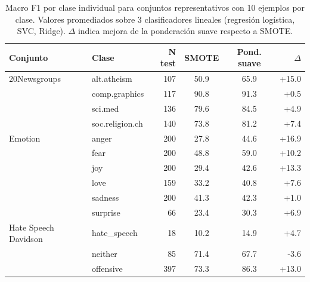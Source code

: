 \begin{table}[htbp]
\centering
\small
\caption{Macro F1 por clase individual para conjuntos representativos con 10 ejemplos por clase. Valores promediados sobre 3 clasificadores lineales (regresión logística, SVC, Ridge). $\Delta$ indica mejora de la ponderación suave respecto a SMOTE.}
\label{tab:per_class_analysis}
\begin{tabular}{llrccr}
\toprule
\textbf{Conjunto} & \textbf{Clase} & \textbf{N test} & \textbf{SMOTE} & \textbf{Pond. suave} & \textbf{$\Delta$} \\
\midrule
20Newsgroups & alt.atheism & 107 & 50.9 & 65.9 & +15.0 \\
 & comp.graphics & 117 & 90.8 & 91.3 & +0.5 \\
 & sci.med & 136 & 79.6 & 84.5 & +4.9 \\
 & soc.religion.ch & 140 & 73.8 & 81.2 & +7.4 \\
\midrule
Emotion & anger & 200 & 27.8 & 44.6 & +16.9 \\
 & fear & 200 & 48.8 & 59.0 & +10.2 \\
 & joy & 200 & 29.4 & 42.6 & +13.3 \\
 & love & 159 & 33.2 & 40.8 & +7.6 \\
 & sadness & 200 & 41.3 & 42.3 & +1.0 \\
 & surprise & 66 & 23.4 & 30.3 & +6.9 \\
\midrule
Hate Speech Davidson & hate\_speech & 18 & 10.2 & 14.9 & +4.7 \\
 & neither & 85 & 71.4 & 67.7 & -3.6 \\
 & offensive & 397 & 73.3 & 86.3 & +13.0 \\
\bottomrule
\end{tabular}
\end{table}